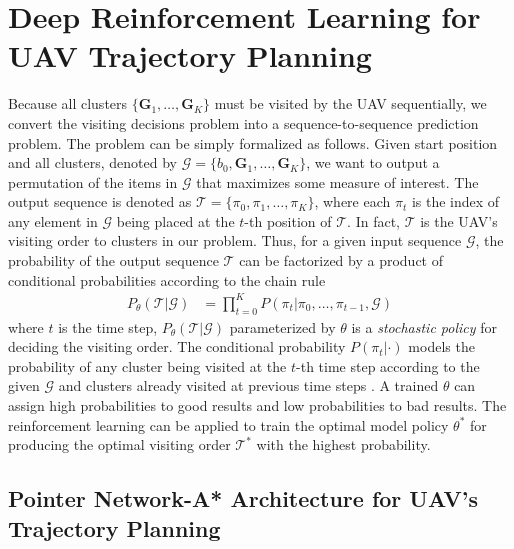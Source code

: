 \documentclass[journal]{IEEEtran}
\begin{document}
	\section{Deep Reinforcement Learning for UAV Trajectory Planning}\label{SecIV}
	
	Because all clusters $\{\bm{G}_1,\dots, \bm{G}_K\}$ must be visited by the UAV sequentially, we convert the visiting decisions problem into a sequence-to-sequence prediction problem. The problem can be simply formalized as follows. Given start position and all clusters, denoted by $\bm{\mathcal{G}} = \{b_0, \bm{G}_1,\dots, \bm{G}_K\}$, we want to output a permutation of the items in $\bm{\mathcal{G}}$ that maximizes some measure of interest. The output sequence is denoted as $\bm{\mathcal{T}} = \{\pi_0,\pi_1,\dots,\pi_K\}$, where each $\pi_t$ is the index of any element in $\bm{\mathcal{G}}$ being placed at the $t$-th position of $\bm{\mathcal{T}}$. In fact, $\bm{\mathcal{T}}$ is the UAV's visiting order to clusters in our problem. Thus, for a given input sequence $\bm{\mathcal{G}}$, the probability of the output sequence $\bm{\mathcal{T}}$ can be factorized by a product of conditional probabilities according to the chain rule
    \begin{equation}
    \begin{aligned}
    \label{chainrule}
        P_\theta(\bm{\mathcal{T}}|\bm{\mathcal{G}}) & = \prod_{t=0}^{K}P(\pi_t|\pi_0,\dots,\pi_{t-1}, \bm{\mathcal{G}})
    \end{aligned}
    \end{equation}
    where $t$ is the time step, $P_{\theta}(\bm{\mathcal{T}}|\bm{\mathcal{G}})$ parameterized by $\theta$ is a \emph{stochastic policy} for deciding the visiting order. The conditional probability $P(\pi_t|\cdot)$ models the probability of any cluster being visited at the $t$-th time step according to the given $\bm{\mathcal{G}}$ and clusters already visited at previous time steps \cite{I. Bello etc.}. A trained $\theta$ can assign high probabilities to good results and low probabilities to bad results. The reinforcement learning can be applied to train the optimal model policy $\theta^*$ for producing the optimal visiting order $\bm{\mathcal{T}}^*$ with the highest probability.

    \subsection{Pointer Network-A* Architecture for UAV's Trajectory Planning}
\end{document}
